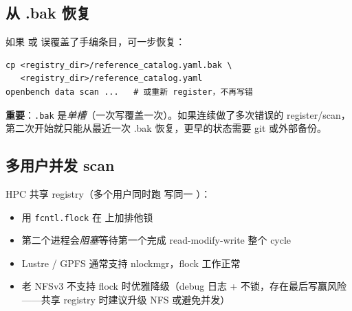\subsection{从 .bak 恢复}

如果  或  误覆盖了手编条目，可一步恢复：

\begin{verbatim}
cp <registry_dir>/reference_catalog.yaml.bak \
   <registry_dir>/reference_catalog.yaml
openbench data scan ...   # 或重新 register，不再写错
\end{verbatim}

\textbf{重要}：\texttt{.bak} 是\emph{单槽}（一次写覆盖一次）。如果连续做了多次错误的 register/scan，第二次开始就只能从最近一次 .bak 恢复，更早的状态需要 git 或外部备份。

\subsection{多用户并发 scan}

HPC 共享 registry（多个用户同时跑  写同一 ）：

\begin{itemize}
  \item {} 用 \texttt{fcntl.flock} 在  上加排他锁
  \item 第二个进程会\emph{阻塞}等待第一个完成 read-modify-write 整个 cycle
  \item Lustre / GPFS 通常支持 nlockmgr，flock 工作正常
  \item 老 NFSv3 不支持 flock 时优雅降级（debug 日志 + 不锁，存在最后写赢风险——共享 registry 时建议升级 NFS 或避免并发）
\end{itemize}
